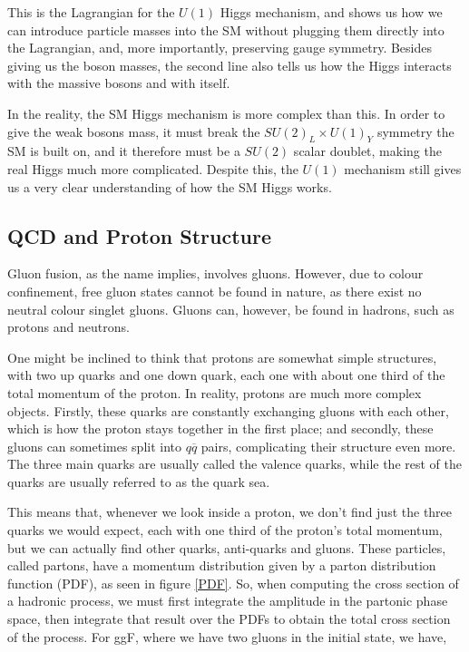 \documentclass[EPJ,twocolumn]{webofc}
\begin{document}
This is the Lagrangian for the $U(1)$ Higgs mechanism, and shows us how we can introduce particle masses into the SM without plugging them directly into the Lagrangian, and, more importantly, preserving gauge symmetry. Besides giving us the boson masses, the second line also tells us how the Higgs interacts with the massive bosons and with itself.

In the reality, the SM Higgs mechanism is more complex than this. In order to give the weak bosons mass, it must break the $SU(2)_L\times U(1)_Y$ symmetry the SM is built on, and it therefore must be a $SU(2)$ scalar doublet,  making the real Higgs much more complicated. Despite this, the $U(1)$ mechanism still gives us a very clear understanding of how the SM Higgs works.

\subsection*{QCD and Proton Structure}
Gluon fusion, as the name implies, involves gluons. However, due to colour confinement, free gluon states cannot be found in nature, as there exist no neutral colour singlet gluons\cite{Thomson:2013zua}. Gluons can, however, be found in hadrons, such as protons and neutrons.

One might be inclined to think that protons are somewhat simple structures, with two up quarks and one down quark, each one with about one third of the total momentum of the proton. In reality, protons are much more complex objects. Firstly, these quarks are constantly exchanging gluons with each other, which is how the proton stays together in the first place; and secondly, these gluons can sometimes split into $q\overline{q}$ pairs, complicating their structure even more. The three main quarks are usually called the valence quarks, while the rest of the quarks are usually referred to as the quark sea.

This means that, whenever we look inside a proton, we don't find just the three quarks we would expect, each with one third of the proton's total momentum, but we can actually find other quarks, anti-quarks and gluons. These particles, called partons, have a momentum distribution given by a parton distribution function (PDF), as seen in figure \ref{PDF}. So, when computing the cross section of a hadronic process, we must first integrate the amplitude in the partonic phase space, then integrate that result over the PDFs to obtain the total cross section of the process. For ggF, where we have two gluons in the initial state, we have,
\end{document}
